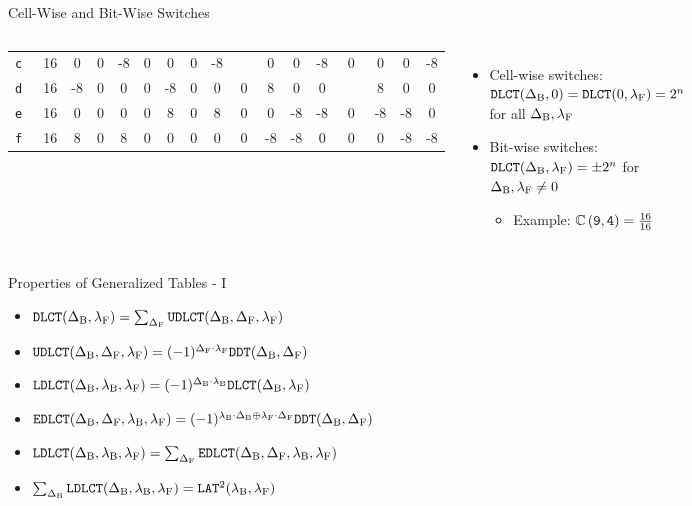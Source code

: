 \begin{frame}{Cell-Wise and Bit-Wise Switches}
\begin{columns}
\begin{center}
{\begin{tabular}{@{}r|*{3}c*{13}{c}@{}}
        \texttt{c\,} & 16 & 0 & 0 & -8 & 0 & 0 & 0 & -8 & \cellcolor{upper}\textcolor{white}{16} & 0 & 0 & -8 & 0 & 0 & 0 & -8\\
        \texttt{d\,} & 16 & -8 & 0 & 0 & 0 & -8 & 0 & 0 & 0 & 8 & 0 & 0 & \cellcolor{upper}\textcolor{white}{-16} & 8 & 0 & 0\\
        \texttt{e\,} & 16 & 0 & 0 & 0 & 0 & 8 & 0 & 8 & 0 & 0 & -8 & -8 & 0 & -8 & -8 & 0\\
        \texttt{f\,} & 16 & 8 & 0 & 8 & 0 & 0 & 0 & 0 & 0 & -8 & -8 & 0 & 0 & 0 & -8 & -8\\
        \bottomrule
      \end{tabular}
    }
  \end{center}
  \begin{itemize}
    \footnotesize
    \item<1-> Cell-wise switches: $\texttt{DLCT}(\Delta_{\textrm{B}}, 0) = \texttt{DLCT}(0, \lambda_{\textrm{F}}) = 2^{n}$ for all $\Delta_{\textrm{B}}, \lambda_{\textrm{F}}$
    \item<1-> Bit-wise switches: $\texttt{DLCT}(\Delta_{\textrm{B}}, \lambda_{\textrm{F}}) = \pm 2^{n}$ for $\Delta_{\textrm{B}}, \lambda_{\textrm{F}} \neq 0$
    \begin{itemize}
      \footnotesize
      \item<1-> Example: $\mathbb{C}\left(\texttt{9}, \texttt{4}\right) = \frac{16}{16}$
    \end{itemize}
  \end{itemize}
\end{columns}
\end{frame}

\begin{frame}{Properties of Generalized \dlct Tables - I}
\begin{itemize}
  \item $\texttt{DLCT}(\Delta_{\textrm{B}}, \lambda_{\textrm{F}}) = \sum_{\Delta_{\textrm{F}}} \texttt{UDLCT}(\Delta_{\textrm{B}}, \Delta_{\textrm{F}}, \lambda_{\textrm{F}}) $ %
  \item $\texttt{UDLCT}(\Delta_{\textrm{B}}, \Delta_{\textrm{F}}, \lambda_{\textrm{F}}) = (-1)^{\Delta_{\textrm{F}} \cdot \lambda_{\textrm{F}}} \texttt{DDT}(\Delta_{\textrm{B}}, \Delta_{\textrm{F}})$
  \item $\texttt{LDLCT}(\Delta_{\textrm{B}}, \lambda_{\textrm{B}}, \lambda_{\textrm{F}}) = (-1)^{\Delta_{\textrm{B}} \cdot \lambda_{\textrm{B}}} \texttt{DLCT}(\Delta_{\textrm{B}}, \lambda_{\textrm{F}})$
  \item $\texttt{EDLCT}(\Delta_{\textrm{B}}, \Delta_{\textrm{F}}, \lambda_{\textrm{B}}, \lambda_{\textrm{F}}) = (-1)^{\lambda_{\textrm{B}} \cdot \Delta_{\textrm{B}} \oplus \lambda_{\textrm{F}} \cdot \Delta_{\textrm{F}}} \texttt{DDT}(\Delta_{\textrm{B}}, \Delta_{\textrm{F}})$
  \item $\texttt{LDLCT}(\Delta_{\textrm{B}}, \lambda_{\textrm{B}}, \lambda_{\textrm{F}}) = \sum_{\Delta_{\textrm{F}}} \texttt{EDLCT}(\Delta_{\textrm{B}}, \Delta_{\textrm{F}}, \lambda_{\textrm{B}}, \lambda_{\textrm{F}})$ %
  \item $\sum_{\Delta_{\textrm{B}}} \texttt{LDLCT}(\Delta_{\textrm{B}}, \lambda_{\textrm{B}}, \lambda_{\textrm{F}}) = \texttt{LAT}^{2}(\lambda_{\textrm{B}}, \lambda_{\textrm{F}})$
\end{itemize}
\end{frame}

